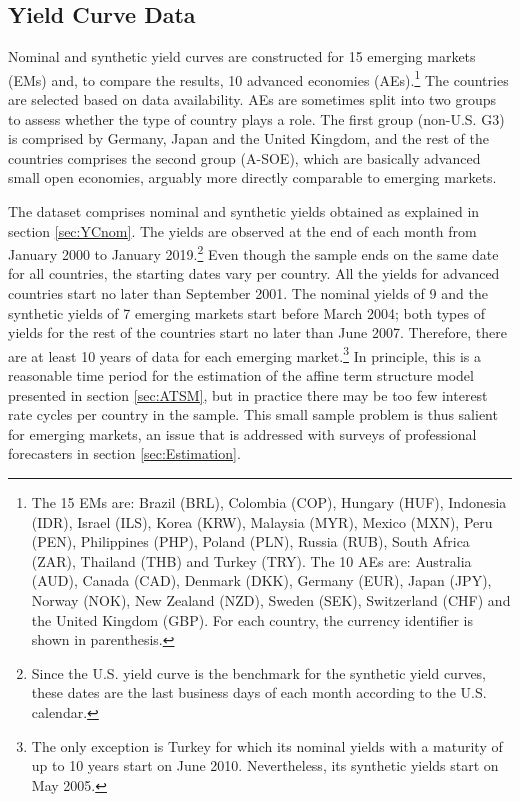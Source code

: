 {\subsection{Yield Curve Data}
\iftoggle{toclinks}{\gototoc}{} %

Nominal and synthetic yield curves are constructed for 15 emerging markets (EMs) and, to compare the results, 10 advanced economies (AEs).\footnote{ The 15 EMs are: Brazil (BRL), Colombia (COP), Hungary (HUF), Indonesia (IDR), Israel (ILS), Korea (KRW), Malaysia (MYR), Mexico (MXN), Peru (PEN), Philippines (PHP), Poland (PLN), Russia (RUB), South Africa (ZAR), Thailand (THB) and Turkey (TRY). The 10 AEs are: Australia (AUD), Canada (CAD), Denmark (DKK), Germany (EUR), Japan (JPY), Norway (NOK), New Zealand (NZD), Sweden (SEK), Switzerland (CHF) and the United Kingdom (GBP). For each country, the currency identifier is shown in parenthesis.} 
The countries are selected based on data availability. 
AEs are sometimes split into two groups to assess whether the type of country plays a role. 
The first group (non-U.S. G3) is comprised by Germany, Japan and the United Kingdom, and the rest of the countries comprises the second group (A-SOE), which are basically advanced small open economies, arguably more directly comparable to emerging markets.

The dataset comprises nominal and synthetic yields obtained as explained in section \ref{sec:YCnom}.
The yields are observed at the end of each month from January 2000 to January 2019.\footnote{ Since the U.S. yield curve is the benchmark for the synthetic yield curves, these dates are the last business days of each month according to the U.S. calendar.}
Even though the sample ends on the same date for all countries, the starting dates 
vary per country.
All the yields for advanced countries start no later than September 2001.
The nominal yields of 9 and the synthetic yields of 7 emerging markets start before March 2004; both types of yields for the rest of the countries start no later than June 2007.
Therefore, there are at least 10 years of data for each emerging market.\footnote{ The only exception is Turkey for which its nominal yields with a maturity of up to 10 years start on June 2010. Nevertheless, its synthetic yields start on May 2005.}
In principle, this is a reasonable time period for the estimation of the affine term structure model presented in section \ref{sec:ATSM}, but in practice there may be too few interest rate cycles per country in the sample.
This small sample problem is thus salient for emerging markets, an issue that is addressed with surveys of professional forecasters in section \ref{sec:Estimation}. 

}

